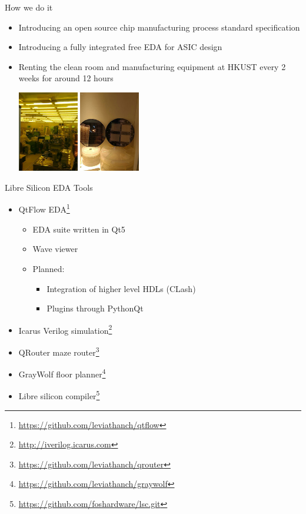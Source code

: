 \documentclass{beamer}
\begin{document}
\begin{frame}{How we do it}
	\begin{itemize}
		\item Introducing an open source chip manufacturing process standard specification
		\item Introducing a fully integrated free EDA for ASIC design\footnotemark
		\item Renting the clean room and manufacturing equipment at HKUST every 2 weeks for around 12 hours \\		
		\begin{center}
			\includegraphics[height=100pt]{cleanroom.png}
			\includegraphics[height=100pt]{examples.png}
		\end{center}
	\end{itemize}

\end{frame}

\begin{frame}{Libre Silicon EDA Tools}
	\begin{itemize}
		\item QtFlow EDA\footnote{\url{https://github.com/leviathanch/qtflow}}
		\begin{itemize}
				\item EDA suite written in Qt5
				\item Wave viewer
				\item Planned:
				\begin{itemize}
					\item Integration of higher level HDLs (CLash)
					\item Plugins through PythonQt
				\end{itemize}
		\end{itemize}
		\item Icarus Verilog simulation\footnote{\url{http://iverilog.icarus.com}}
		\item QRouter maze router\footnote{\url{https://github.com/leviathanch/qrouter}}
		\item GrayWolf floor planner\footnote{\url{https://github.com/leviathanch/graywolf}}
		\item Libre silicon compiler\footnote{\url{https://github.com/foshardware/lsc.git}}
	\end{itemize}

\end{frame}
\end{document}
